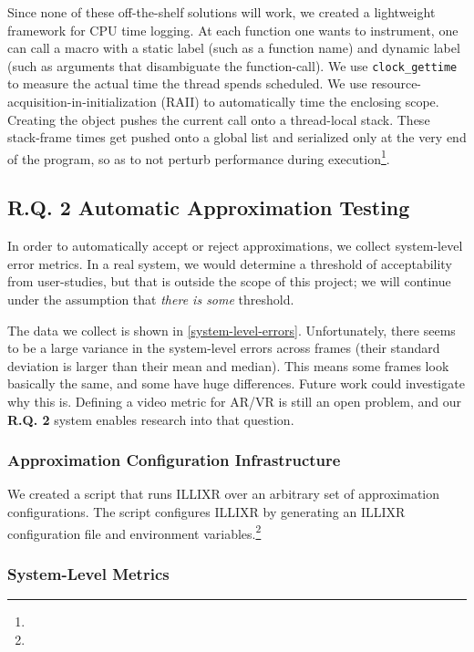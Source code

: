 Since none of these off-the-shelf solutions will work, we created a lightweight framework for CPU time logging.
At each function one wants to instrument, one can call a macro with a static label (such as a function name) and dynamic label (such as arguments that disambiguate the function-call).
We use \verb+clock_gettime+ to measure the actual time the thread spends scheduled.
We use resource-acquisition-in-initialization (RAII) to automatically time the enclosing scope.
Creating the object pushes the current call onto a thread-local stack.
These stack-frame times get pushed onto a global list and serialized only at the very end of the program, so as to not perturb performance during execution\footnote{}.

\subsection{R.Q. 2 Automatic Approximation Testing}

In order to automatically accept or reject approximations, we collect system-level error metrics.
In a real system, we would determine a threshold of acceptability from user-studies, but that is outside the scope of this project;
    we will continue under the assumption that \textit{there is some} threshold.

The data we collect is shown in \cref{system-level-errors}.
Unfortunately, there seems to be a large variance in the system-level errors across frames (their standard deviation is larger than their mean and median).
This means some frames look basically the same, and some have huge differences.
Future work could investigate why this is.
Defining a video metric for AR/VR is still an open problem, and our \textbf{R.Q. 2} system enables research into that question.

\subsubsection{Approximation Configuration Infrastructure}

We created a script that runs ILLIXR over an arbitrary set of approximation configurations.
The script configures ILLIXR by generating an ILLIXR configuration file and environment variables.\footnote{}

\subsubsection{System-Level Metrics}

